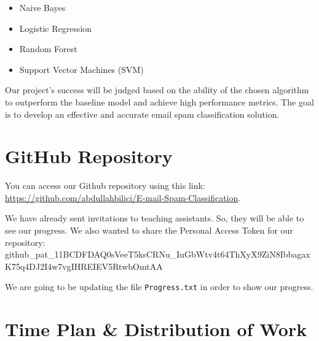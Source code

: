 \documentclass[conference]{IEEEtran}
\begin{document}
\begin{itemize}
    \item Naive Bayes
    \item Logistic Regression
    \item Random Forest
    \item Support Vector Machines (SVM)
\end{itemize}

Our project's success will be judged based on the ability of the chosen algorithm to outperform the baseline model and achieve high performance metrics. The goal is to develop an effective and accurate email spam classification solution.

\section{GitHub Repository}
You can access our Github repository using this link: \href{https://github.com/abdullahbilici/E-mail-Spam-Classification}{https://github.com/abdullahbilici/E-mail-Spam-Classification}.

We have already sent invitations to teaching assistants. So, they will be able to see our progress. We also wanted to share the Personal Access Token for our repository: {\tiny github\_pat\_11BCDFDAQ0sVeeT5ksCRNu\_IuGbWtv4t64ThXyX9ZiN8IbbagaxK75q4DJ2I4w7vgIHREIEV5RtwbOmtAA}

We are going to be updating the file \verb|Progress.txt| in order to show our progress.

\section{Time Plan \& Distribution of Work}
\end{document}
